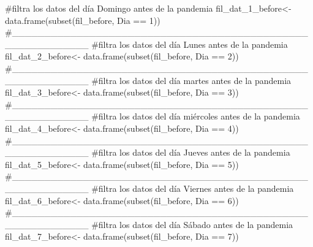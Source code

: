 \documentclass[
  us-letterpaper,
]{scrreprt}
\newenvironment{Shaded}{\begin{snugshade}}{\end{snugshade}}
\newcommand{\CommentTok}[1]{\textcolor[rgb]{0.37,0.37,0.37}{#1}}
\newcommand{\DecValTok}[1]{\textcolor[rgb]{0.68,0.00,0.00}{#1}}
\newcommand{\FunctionTok}[1]{\textcolor[rgb]{0.28,0.35,0.67}{#1}}
\newcommand{\NormalTok}[1]{\textcolor[rgb]{0.00,0.23,0.31}{#1}}
\newcommand{\OtherTok}[1]{\textcolor[rgb]{0.00,0.23,0.31}{#1}}
\newcommand{\SpecialCharTok}[1]{\textcolor[rgb]{0.37,0.37,0.37}{#1}}
\theoremstyle{definition}
\theoremstyle{plain}
\theoremstyle{plain}
\theoremstyle{remark}
\begin{document}
\begin{Shaded}
\begin{Highlighting}[]
\CommentTok{\#filtra los datos del día Domingo antes de la pandemia}
\NormalTok{fil\_dat\_1\_before}\OtherTok{\textless{}{-}} \FunctionTok{data.frame}\NormalTok{(}\FunctionTok{subset}\NormalTok{(fil\_before, Dia }\SpecialCharTok{==} \DecValTok{1}\NormalTok{))}
\CommentTok{\#\_\_\_\_\_\_\_\_\_\_\_\_\_\_\_\_\_\_\_\_\_\_\_\_\_\_\_\_\_\_\_\_\_\_\_\_\_\_\_\_\_\_\_\_\_\_\_\_\_\_\_\_\_\_\_\_\_\_\_}
\CommentTok{\#filtra los datos del día Lunes antes de la pandemia}
\NormalTok{fil\_dat\_2\_before}\OtherTok{\textless{}{-}} \FunctionTok{data.frame}\NormalTok{(}\FunctionTok{subset}\NormalTok{(fil\_before, Dia }\SpecialCharTok{==} \DecValTok{2}\NormalTok{))}
\CommentTok{\#\_\_\_\_\_\_\_\_\_\_\_\_\_\_\_\_\_\_\_\_\_\_\_\_\_\_\_\_\_\_\_\_\_\_\_\_\_\_\_\_\_\_\_\_\_\_\_\_\_\_\_\_\_\_\_\_\_\_\_}
\CommentTok{\#filtra los datos del día martes antes de la pandemia}
\NormalTok{fil\_dat\_3\_before}\OtherTok{\textless{}{-}} \FunctionTok{data.frame}\NormalTok{(}\FunctionTok{subset}\NormalTok{(fil\_before, Dia }\SpecialCharTok{==} \DecValTok{3}\NormalTok{))}
\CommentTok{\#\_\_\_\_\_\_\_\_\_\_\_\_\_\_\_\_\_\_\_\_\_\_\_\_\_\_\_\_\_\_\_\_\_\_\_\_\_\_\_\_\_\_\_\_\_\_\_\_\_\_\_\_\_\_\_\_\_\_\_}
\CommentTok{\#filtra los datos del día miércoles antes de la pandemia}
\NormalTok{fil\_dat\_4\_before}\OtherTok{\textless{}{-}} \FunctionTok{data.frame}\NormalTok{(}\FunctionTok{subset}\NormalTok{(fil\_before, Dia }\SpecialCharTok{==} \DecValTok{4}\NormalTok{))}
\CommentTok{\#\_\_\_\_\_\_\_\_\_\_\_\_\_\_\_\_\_\_\_\_\_\_\_\_\_\_\_\_\_\_\_\_\_\_\_\_\_\_\_\_\_\_\_\_\_\_\_\_\_\_\_\_\_\_\_\_\_\_\_}
\CommentTok{\#filtra los datos del día Jueves antes de la pandemia}
\NormalTok{fil\_dat\_5\_before}\OtherTok{\textless{}{-}} \FunctionTok{data.frame}\NormalTok{(}\FunctionTok{subset}\NormalTok{(fil\_before, Dia }\SpecialCharTok{==} \DecValTok{5}\NormalTok{))}
\CommentTok{\#\_\_\_\_\_\_\_\_\_\_\_\_\_\_\_\_\_\_\_\_\_\_\_\_\_\_\_\_\_\_\_\_\_\_\_\_\_\_\_\_\_\_\_\_\_\_\_\_\_\_\_\_\_\_\_\_\_\_\_}
\CommentTok{\#filtra los datos del día Viernes antes de la pandemia}
\NormalTok{fil\_dat\_6\_before}\OtherTok{\textless{}{-}} \FunctionTok{data.frame}\NormalTok{(}\FunctionTok{subset}\NormalTok{(fil\_before, Dia }\SpecialCharTok{==} \DecValTok{6}\NormalTok{))}
\CommentTok{\#\_\_\_\_\_\_\_\_\_\_\_\_\_\_\_\_\_\_\_\_\_\_\_\_\_\_\_\_\_\_\_\_\_\_\_\_\_\_\_\_\_\_\_\_\_\_\_\_\_\_\_\_\_\_\_\_\_\_\_}
\CommentTok{\#filtra los datos del día Sábado antes de la pandemia}
\NormalTok{fil\_dat\_7\_before}\OtherTok{\textless{}{-}} \FunctionTok{data.frame}\NormalTok{(}\FunctionTok{subset}\NormalTok{(fil\_before, Dia }\SpecialCharTok{==} \DecValTok{7}\NormalTok{))}
\end{Highlighting}
\end{Shaded}
\end{document}
